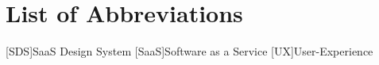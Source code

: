 \section*{List of Abbreviations}
\begin{acronym}
    [SDS]{SaaS Design System}
    [SaaS]{Software as a Service}
    [UX]{User-Experience}

\end{acronym}